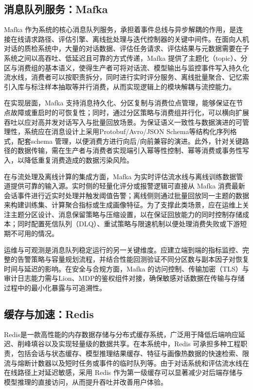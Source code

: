 \subsection{消息队列服务：Mafka}
Mafka 作为系统的核心消息队列服务，承担着事件总线与异步解耦的作用，是连接在线请求路径、评估引擎、离线批处理与迭代控制器的关键中间件。在面向人机对话的质检系统中，大量的对话数据、评估任务请求、评估结果与元数据需要在子系统之间以高吞吐、低延迟且可靠的方式传递\cite{telecom4020018}，Mafka 提供了主题化（topic）、分区与消费组的基本语义，使得生产者可将对话流、模型输出与监控事件写入持久化流水线，消费者可以按职责拆分，同时进行实时评分服务、离线批量聚合、记忆索引入库与标注样本抽取等并行消费，从而实现逻辑上的模块解耦与流控能力。

在实现层面，Mafka 支持消息持久化、分区复制与消费位点管理，能够保证在节点故障或重启时的可恢复性；同时，通过分区策略与消费组并行化，可以横向扩展吞吐以应对高并发对话写入与批量回放场景。为保证语义一致性与数据演进的可管理性，系统应在消息设计上采用Protobuf/Avro/JSON Schema等结构化序列格式，配套schema 管理，以便消费方进行向后/向前兼容的演进。此外，针对关键路径的数据传输，需在生产者与消费者实现端引入幂等性控制、幂等消费或事务性写入，以降低重复消费造成的数据污染风险。

在与流处理及离线计算的集成方面，Mafka 为实时评估流水线与离线训练数据管道提供可靠的输入源。实时侧的轻量化评分或报警逻辑可直接从 Mafka 消费最新会话事件进行近实时处理并触发阈值告警；离线侧则通过批量回放同一主题的数据来构建训练集、计算聚合指标或生成画像特征。为了支撑此类场景，应在运维上关注主题分区设计、消息保留策略与压缩设置，以在保证回放能力的同时控制存储成本；同时配置死信队列（DLQ）、重试策略与限速机制以便处理消费失败或下游短期不可用的情况。

运维与可观测是消息队列稳定运行的另一关键维度。应建立端到端的指标监控、完整的告警策略与容量规划流程，并结合性能回测验证不同分区数与副本因子对恢复时间与延迟的影响。在安全与合规方面，Mafka 的访问控制、传输加密（TLS）与审计日志能力需与Lion、MDP的鉴权组件对接，确保敏感对话数据在传输与存储过程中的最小化暴露与可追溯性。
\subsection{缓存与加速：Redis}
Redis是一款高性能的内存数据存储与分布式缓存系统，广泛用于降低后端响应延迟、削峰填谷以及实现轻量级的数据共享。在本系统中，Redis 可承担多种工程职责，包括会话与状态缓存、模型推理结果缓存、特征与画像热数据的快速检索、限流与熔断计数器以及短时任务或事件的临时队列等。由于对话系统和评估流水线在在线路径上对延迟敏感，采用 Redis 作为第一级缓存可以显著减少对后端存储与模型推理的直接访问，从而提升吞吐并改善用户体验\cite{jin2024ragcacheefficientknowledgecaching}。

